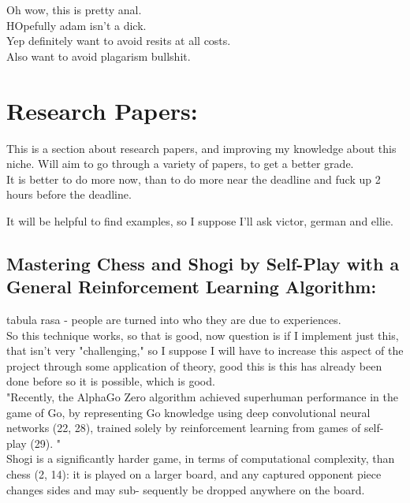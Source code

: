 \documentclass [12pt]{article}
\begin{document}
Oh wow, this is pretty anal.\\ 

HOpefully adam isn't a dick.\\ 

Yep definitely want to avoid resits at all costs.\\ 
Also want to avoid plagarism bullshit.\\ 


\section{Research Papers: }


This is a section about research papers, and improving my knowledge about this niche. Will aim to go through a variety of papers, to get a better grade. \\ 

It is better to do more now, than to do more near the deadline and fuck up 2 hours before the deadline. 

It will be helpful to find examples, so I suppose I'll ask victor, german and ellie. \\ 

\subsection{Mastering Chess and Shogi by Self-Play with a
General Reinforcement Learning Algorithm: }

tabula rasa - people are turned into who they are due to experiences.\\ 

So this technique works, so that is good, now question is if I implement 
just this, that isn't very "challenging," so I suppose I will have to increase this aspect of the project through some application of theory, good this is 
this has already been done before so it is possible, which is good.\\ 


"Recently, the AlphaGo Zero algorithm
achieved superhuman performance in the game of Go, by representing Go knowledge using
deep convolutional neural networks (22, 28), trained solely by reinforcement learning from
games of self-play (29). "\\

Shogi is a significantly harder game, in terms of computational complexity, than chess (2,
14): it is played on a larger board, and any captured opponent piece changes sides and may sub-
sequently be dropped anywhere on the board.\\
\end{document}
